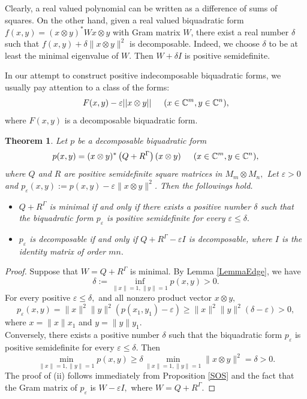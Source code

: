 \documentclass[12pt,a4paper]{amsart}
\theoremstyle{plain}
\newtheorem{theorem}{Theorem}[section]
\theoremstyle{remark}
\theoremstyle{definition}
\def \C {\mathbb{C}}
\begin{document}
Clearly, a real valued polynomial can be written as a difference of sums of squares. On the other hand, given a real valued biquadratic form $f(x,y) = (x\otimes y)^* W x\otimes y $ with Gram matrix $W$, there exist a real number $\delta$ such that $f(x,y) + \delta \|x\otimes y\|^2$ is decomposable. Indeed, we choose $\delta$ to be at least the minimal eigenvalue of $W.$ Then $W+ \delta I$ is positive semidefinite. 
   
In our attempt to construct positive indecomposable biquadratic forms, we usually pay attention to a class of the forms:
$$
F(x,y) - \varepsilon ||x\otimes y || \quad \enskip (x\in \C^m, y\in \C^n),
$$   
where $F(x,y)$ is a decomposable biquadratic form.
\begin{theorem}\label{Theorem1}
	Let $p$ be a decomposable biquadratic form 
	$$
	p(x,y) = (x\otimes y)^* \left( Q  +R^{\Gamma}\right)(x\otimes y)  \quad  \enskip (x\in \C^m, y\in \C^n),
	$$
	where $Q$ and $R$ are positive semidefinite square matrices in $M_m\otimes M_n,$ Let $\varepsilon>0 $ and 
	$p_{\varepsilon} (x,y) := p(x,y) - \varepsilon \| x\otimes y\|^2$.  Then the followings hold.
\begin{itemize}
	\item[(i)] $Q+R^{\Gamma}$ is minimal if and only if there exists a positive number $\delta$ such that  
	the biquadratic form $p_{\varepsilon} $ is positive semidefinite for every $\varepsilon \le \delta.$
	\item[(ii)] $p_{\varepsilon}$ is decomposable if and only if $Q+R^{\Gamma}-\varepsilon I$ is decomposable, where $I$ is the identity matrix of order $mn.$
\end{itemize}
\end{theorem}
\begin{proof}
 Suppose that $W=Q+R^{\Gamma}$ is minimal. By Lemma \ref{LemmaEdge}, we have
	$$\delta:= \inf_{\|x\| =1, \| y\|=1} p(x,y) >0.$$
	For every positive $\varepsilon \le \delta,$ and all nonzero product vector $x\otimes y,$  
	$$
	p_{\varepsilon} (x,y) =\|x\|^2\|y\|^2 \left(p(x_1,y_1) - \varepsilon \right)  \ge \| x\|^2 \|y\|^2 (\delta - \varepsilon) >0, 
	$$
	where $x = \|x\| x_1 $ and $y= \|y\| y_1.$ \\
Conversely, there exists a positive number $\delta$ such that  
the biquadratic form $p_{\varepsilon}$ is positive semidefinite for every $\varepsilon \le \delta.$ Then 
$$
\min_{\| x\| =1, \| y \| =1 } p(x,y) \ge \delta \min_{\| x\| =1, \| y \| =1} \| x\otimes y\|^2 =\delta >0. 
$$
The proof of (ii) follows immediately from Proposition \ref{SOS} and the fact that the Gram matrix of $p_{\varepsilon}$ is $W-\varepsilon I,$ where $W=Q+R^{\Gamma}.$
\end{proof}
\end{document}
